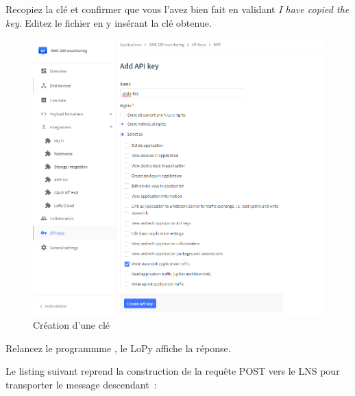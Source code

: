          \vspace{1em}

Recopiez la clé et confirmer que vous l'avez bien fait en validant \textit{I have copied the key}. Editez le fichier  en y insérant la clé obtenue.


\begin{figure}[tbp]
\centerline{\includegraphics[width=.7\columnwidth]{Pictures/ttn-key.png} }
\caption{Création d'une clé}
\label{fig-ttn-key}
\end{figure}

Relancez le programmme , le LoPy  affiche la réponse.

         \vspace{1em}

Le listing suivant reprend la construction de la requête POST vers le LNS pour transporter le message descendant~:


